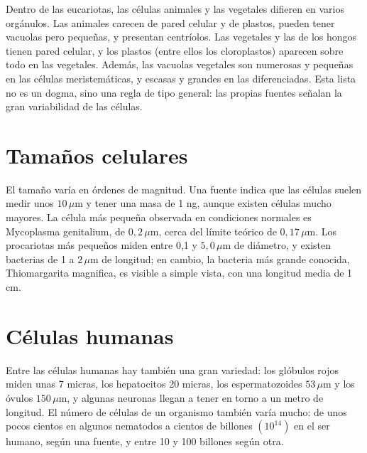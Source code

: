 \documentclass{book}
\begin{document}
Dentro de las eucariotas, las células animales y las vegetales difieren en varios orgánulos. Las animales carecen de pared celular y de plastos, pueden tener vacuolas pero pequeñas, y presentan centríolos. Las vegetales y las de los hongos tienen pared celular, y los plastos (entre ellos los cloroplastos) aparecen sobre todo en las vegetales. Además, las vacuolas vegetales son numerosas y pequeñas en las células meristemáticas, y escasas y grandes en las diferenciadas. Esta lista no es un dogma, sino una regla de tipo general: las propias fuentes señalan la gran variabilidad de las células.


\section{Tamaños celulares}

El tamaño varía en órdenes de magnitud. Una fuente indica que las células suelen medir unos \(10\,\mu\mathrm{m}\) y tener una masa de 1 ng, aunque existen células mucho mayores. La célula más pequeña observada en condiciones normales es Mycoplasma genitalium, de \(0{,}2\,\mu\mathrm{m}\), cerca del límite teórico de \(0{,}17\,\mu\mathrm{m}\). Los procariotas más pequeños miden entre 0,1 y \(5{,}0\,\mu\mathrm{m}\) de diámetro, y existen bacterias de 1 a \(2\,\mu\mathrm{m}\) de longitud; en cambio, la bacteria más grande conocida, Thiomargarita magnifica, es visible a simple vista, con una longitud media de 1 cm.


\section{Células humanas}

Entre las células humanas hay también una gran variedad: los glóbulos rojos miden unas 7 micras, los hepatocitos 20 micras, los espermatozoides \(53\,\mu\mathrm{m}\) y los óvulos \(150\,\mu\mathrm{m}\), y algunas neuronas llegan a tener en torno a un metro de longitud. El número de células de un organismo también varía mucho: de unos pocos cientos en algunos nematodos a cientos de billones \((10^{14})\) en el ser humano, según una fuente, y entre 10 y 100 billones según otra.
\end{document}
